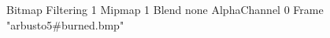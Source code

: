 {Bitmap
	{Filtering 1}
	{Mipmap 1}
	{Blend none}
	{AlphaChannel 0}
	{Frame "arbusto5#burned.bmp"}
}
